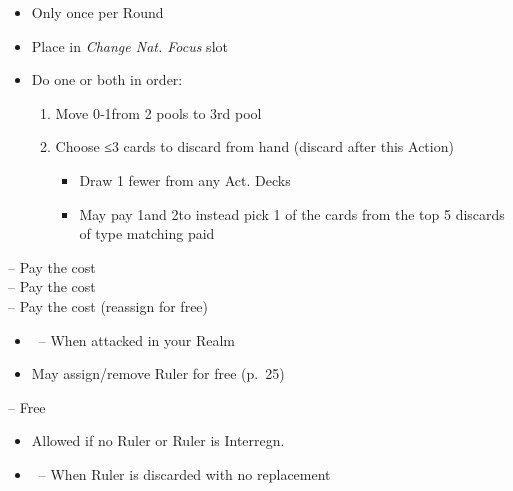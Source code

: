\documentclass[10pt]{article}
\begin{document}
\begin{itemize}
	\item Only once per Round
	\item Place \cube in \emph{Change Nat. Focus} slot
	\item Do one or both in order:
	\begin{enumerate}
		\item Move 0‑1\monarchpower from 2 pools to 3rd pool
		\item Choose ≤3 cards to discard from hand (discard after this Action)
		\begin{itemize}
			\item Draw 1 fewer from any Act. Decks
			\item May pay 1\monarchpower and 2\ducats to instead pick 1 of the cards from the top 5 discards of type matching paid \monarchpower
		\end{itemize}
	\end{enumerate}
\end{itemize}

\framebreak

 -- Pay the \ducat cost\\
 -- Pay the \milpower cost\\
 -- Pay the \milpower cost (reassign for free)\\
\begin{itemize}
	\item \reaction~-- When attacked in your Realm
	\item May assign/remove Ruler for free (p.~25)
\end{itemize}
 -- Free
\begin{itemize}
	\item Allowed if no Ruler or Ruler is \dprime Interregn.\dprime
	\item \reaction~-- When Ruler is discarded with no replacement
\end{itemize}
\end{document}
